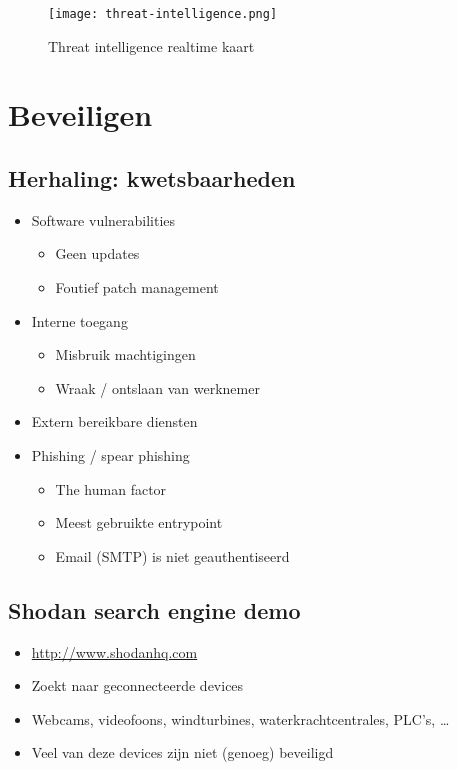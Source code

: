 \documentclass{article}
\begin{document}
\begin{figure}[H]
    \centering
    \texttt{[image: threat-intelligence.png]}
    \caption{Threat intelligence realtime kaart}
\end{figure}

\section{Beveiligen}

\subsection{Herhaling: kwetsbaarheden}

\begin{itemize}
    \item Software vulnerabilities
    \begin{itemize}
        \item Geen updates
        \item Foutief patch management
    \end{itemize}
    \item Interne toegang
    \begin{itemize}
        \item Misbruik machtigingen
        \item Wraak / ontslaan van werknemer
    \end{itemize}
    \item Extern bereikbare diensten
    \item Phishing / spear phishing
    \begin{itemize}
        \item The human factor
        \item Meest gebruikte entrypoint
        \item Email (SMTP) is niet geauthentiseerd
    \end{itemize}
\end{itemize}

\subsection{Shodan search engine demo}

\begin{itemize}
    \item \url{http://www.shodanhq.com}
    \item Zoekt naar geconnecteerde devices
    \item Webcams, videofoons, windturbines, waterkrachtcentrales, PLC's, \dots
    \item Veel van deze devices zijn niet (genoeg) beveiligd
\end{itemize}
\end{document}
